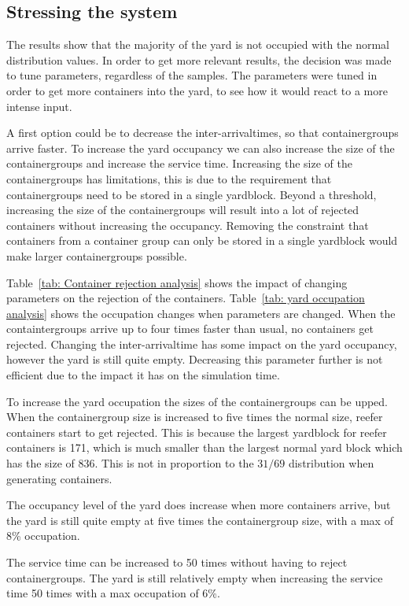 \documentclass[]{article}
\begin{document}
\subsection{Stressing the system}
The results show that the majority of the yard is not occupied with the normal
distribution values. In order to get more relevant results, the decision was
made to tune parameters, regardless of the samples. The parameters were tuned
in order to get more containers into the yard, to see how it would react to a
more intense input.

A first option could be to decrease the inter-arrivaltimes, so that
containergroups arrive faster. To increase the yard occupancy we can also
increase the size of the containergroups and increase the service time.
Increasing the size of the containergroups has limitations, this is due to the
requirement that containergroups need to be stored in a single yardblock.
Beyond a threshold, increasing the size of the containergroups will result into
a lot of rejected containers without increasing the occupancy. Removing the
constraint that containers from a container group can only be stored in a
single yardblock would make larger containergroups possible.

Table~\ref{tab: Container rejection analysis} shows the impact of changing
parameters on the rejection of the containers. Table~\ref{tab: yard occupation
	analysis} shows the occupation changes when parameters are changed. When the
containtergroups arrive up to four times faster than usual, no containers get
rejected. Changing the inter-arrivaltime has some impact on the yard occupancy,
however the yard is still quite empty. Decreasing this parameter further is not
efficient due to the impact it has on the simulation time.

To increase the yard occupation the sizes of the containergroups can be upped.
When the containergroup size is increased to five times the normal size, reefer
containers start to get rejected. This is because the largest yardblock for
reefer containers is 171, which is much smaller than the largest normal yard
block which has the size of 836. This is not in proportion to the $31/69$
distribution when generating containers.

The occupancy level of the yard does increase when more containers arrive, but
the yard is still quite empty at five times the containergroup size, with a max
of 8\% occupation.

The service time can be increased to 50 times without having to reject
containergroups. The yard is still relatively empty when increasing the service
time 50 times with a max occupation of 6\%.
\end{document}
